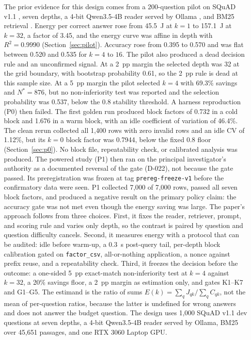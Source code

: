 \documentclass[a4paper,fleqn]{cas-sc}
\begin{document}
The prior evidence for this design comes from a 200-question pilot on SQuAD v1.1 \cite{rajpurkar2016squad}, seven depths, a 4-bit Qwen3.5-4B reader served by Ollama \cite{ollama}, and BM25 retrieval \cite{robertson2009bm25}. Energy per correct answer rose from 45.5~J at $k=1$ to 157.1~J at $k=32$, a factor of 3.45, and the energy curve was affine in depth with $R^{2}=0.9990$ (Section~\ref{sec:pilot}). Accuracy rose from 0.395 to 0.570 and was flat between 0.520 and 0.535 for $k=4$ to $16$. The pilot also produced a dead decision rule and an unconfirmed signal. At a 2~pp margin the selected depth was 32 at the grid boundary, with bootstrap probability 0.61, so the 2~pp rule is dead at this sample size. At a 5~pp margin the pilot selected $k=4$ with 69.3\% savings and $N^{*}=876$, but no non-inferiority test was reported and the selection probability was 0.537, below the 0.8 stability threshold. A harness reproduction (P0) then failed. The first golden run produced block factors of 0.732 in a cold block and 1.676 in a warm block, with an idle coefficient of variation of 46.4\%. The clean rerun collected all 1{,}400 rows with zero invalid rows and an idle CV of 1.12\%, but its $k=0$ block factor was 0.7944, below the fixed 0.8 floor (Section~\ref{sec:p0}). No block file, repeatability check, or calibrated analysis was produced. The powered study (P1) then ran on the principal investigator's authority as a documented reversal of the gate (D-022), not because the gate passed. Its preregistration was frozen at tag \texttt{prereg-freeze-v1} before the confirmatory data were seen. P1 collected 7{,}000 of 7{,}000 rows, passed all seven block factors, and produced a negative result on the primary policy claim: the accuracy gate was not met even though the energy saving was large. The paper's approach follows from three choices. First, it fixes the reader, retriever, prompt, and scoring rule and varies only depth, so the contrast is paired by question and question difficulty cancels. Second, it measures energy with a protocol that can be audited: idle before warm-up, a 0.3~s post-query tail, per-depth block calibration gated on \texttt{factor\_csv}, all-or-nothing application, a nonce against prefix reuse, and a repeatability check. Third, it freezes the decision before the outcome: a one-sided 5~pp exact-match non-inferiority test at $k=4$ against $k=32$, a 20\% savings floor, a 2~pp margin as estimation only, and gates K1--K7 and G1--G5. The estimand is the ratio of sums $E(k)=\sum_{q}J_{qk}/\sum_{q}C_{qk}$, not the mean of per-question ratios, because the latter is undefined for wrong answers and does not answer the budget question. The design uses 1{,}000 SQuAD v1.1 dev questions at seven depths, a 4-bit Qwen3.5-4B reader served by Ollama, BM25 over 45{,}651 passages, and one RTX 3060 Laptop GPU.
\end{document}
